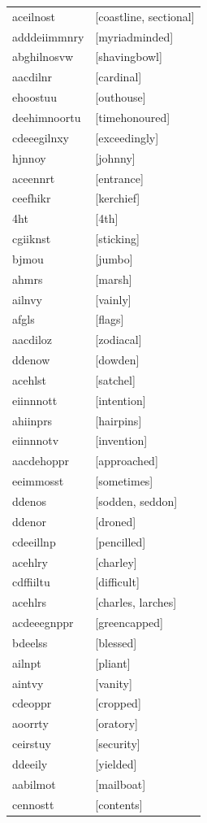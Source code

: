 \documentclass{article}
\begin{document}
\begin{tabular}{ll}
aceilnost & [coastline, sectional] \\
adddeiimmnry & [myriadminded] \\
abghilnosvw & [shavingbowl] \\
aacdilnr & [cardinal] \\
ehoostuu & [outhouse] \\
deehimnoortu & [timehonoured] \\
cdeeegilnxy & [exceedingly] \\
hjnnoy & [johnny] \\
aceennrt & [entrance] \\
ceefhikr & [kerchief] \\
4ht & [4th] \\
cgiiknst & [sticking] \\
bjmou & [jumbo] \\
ahmrs & [marsh] \\
ailnvy & [vainly] \\
afgls & [flags] \\
aacdiloz & [zodiacal] \\
ddenow & [dowden] \\
acehlst & [satchel] \\
eiinnnott & [intention] \\
ahiinprs & [hairpins] \\
eiinnnotv & [invention] \\
aacdehoppr & [approached] \\
eeimmosst & [sometimes] \\
ddenos & [sodden, seddon] \\
ddenor & [droned] \\
cdeeillnp & [pencilled] \\
acehlry & [charley] \\
cdffiiltu & [difficult] \\
acehlrs & [charles, larches] \\
acdeeegnppr & [greencapped] \\
bdeelss & [blessed] \\
ailnpt & [pliant] \\
aintvy & [vanity] \\
cdeoppr & [cropped] \\
aoorrty & [oratory] \\
ceirstuy & [security] \\
ddeeily & [yielded] \\
aabilmot & [mailboat] \\
cennostt & [contents] \\

\end{tabular}
\end{document}
